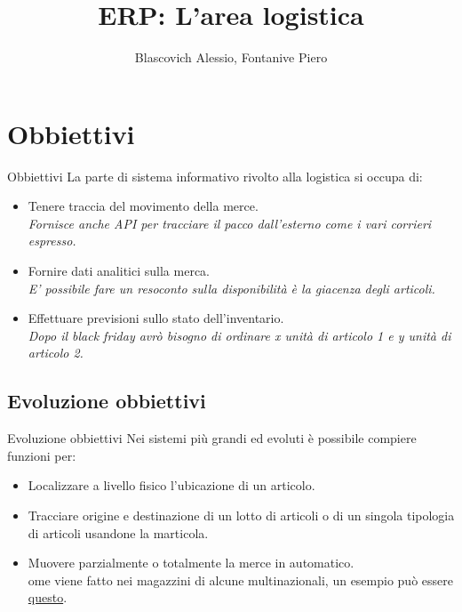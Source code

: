 \documentclass{beamer}
\title{ERP: L'area logistica}
\author{Blascovich Alessio, Fontanive Piero}
\date{}
\begin{document}
    \begin{frame}
        \titlepage
    \end{frame}

    \section{Obbiettivi}
    \begin{frame}{Obbiettivi}
        La parte di sistema informativo rivolto alla logistica si occupa di:
        \begin{itemize}
            \item Tenere traccia del movimento della merce.\\
                \textit{Fornisce anche API per tracciare il pacco dall'esterno come i vari corrieri espresso.}
            \item Fornire dati analitici sulla merca.\\
                \textit{E' possibile fare un resoconto sulla disponibilità è la giacenza degli articoli.}
            \item Effettuare previsioni sullo stato dell'inventario.\\
                \textit{Dopo il black friday avrò bisogno di ordinare x unità di articolo 1 e y unità di articolo 2.}
        \end{itemize}
    \end{frame}

    \subsection{Evoluzione obbiettivi}
    \begin{frame}{Evoluzione obbiettivi}
        Nei sistemi più grandi ed evoluti è possibile compiere funzioni per:
        \begin{itemize}
            \item Localizzare a livello fisico l'ubicazione di un articolo.
            \item Tracciare origine e destinazione di un lotto di articoli o di un singola tipologia di articoli usandone la marticola.
            \item Muovere parzialmente o totalmente la merce in automatico.\\
                ome viene fatto nei magazzini di alcune multinazionali, un esempio può essere \href{https://www.youtube.com/watch?v=YL9XjyXsKKk}{questo}.
        \end{itemize}
    \end{frame}
\end{document}
